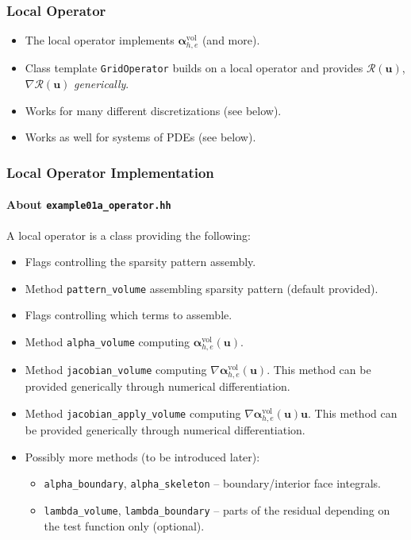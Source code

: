 \begin{frame}
\frametitle{Local Operator}
\begin{itemize}
\item The local operator implements $\bm{\alpha}_{h,e}^{\text{vol}}$ (and more).
\item Class template \lstinline{GridOperator} builds on a local operator and
provides $\mathcal{R}(\mathbf{u})$, $\nabla\mathcal{R}(\mathbf{u})$ \textit{generically}.
\item Works for many different discretizations (see below).
\item Works as well for systems of PDEs (see below).
\end{itemize}
\end{frame}

\begin{frame}
\frametitle{Local Operator Implementation}
\framesubtitle{About \lstinline{example01a_operator.hh}}
A local operator is a class providing the following:
\begin{itemize}
\item Flags controlling the sparsity pattern assembly.
\item Method \lstinline{pattern_volume} assembling sparsity pattern (default provided).
\item Flags controlling which terms to assemble.
\item Method \lstinline{alpha_volume} computing $\bm{\alpha}_{h,e}^{\text{vol}}(\mathbf{u})$.
\item Method \lstinline{jacobian_volume} computing $\nabla\bm{\alpha}_{h,e}^{\text{vol}}(\mathbf{u})$. 
This method can be provided generically through numerical differentiation.
\item Method \lstinline{jacobian_apply_volume} computing $\nabla\bm{\alpha}_{h,e}^{\text{vol}}(\mathbf{u})\mathbf{u}$. 
This method can be provided generically through numerical differentiation.
\item Possibly more methods (to be introduced later):
\begin{itemize}
\item \lstinline{alpha_boundary}, \lstinline{alpha_skeleton} -- boundary/interior face integrals.
\item \lstinline{lambda_volume}, \lstinline{lambda_boundary} -- parts of the residual depending on the test function only (optional).
\end{itemize}
\end{itemize}
\end{frame}

